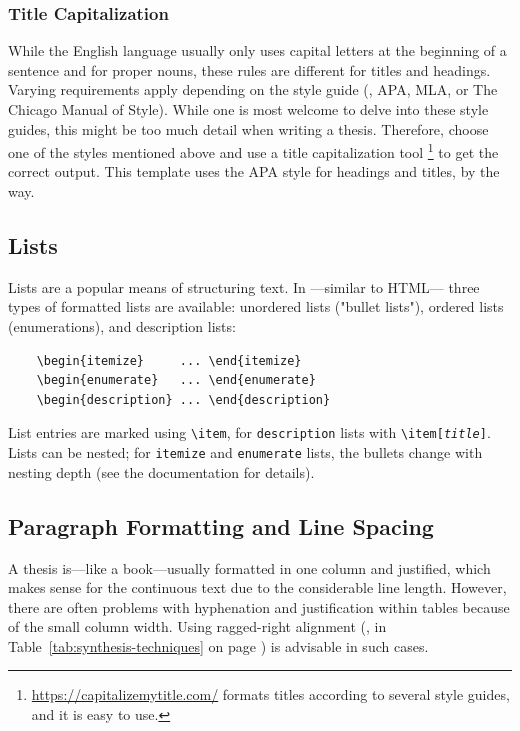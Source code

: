 \subsubsection{Title Capitalization}

While the English language usually only uses capital letters at the beginning of
a sentence and for proper nouns, these rules are different for titles and
headings. Varying requirements apply depending on the style guide (\eg, APA,
MLA, or The Chicago Manual of Style). While one is most welcome to delve into
these style guides, this might be too much detail when writing a thesis.
Therefore, choose one of the styles mentioned above and use a
title capitalization tool%
\footnote{\url{https://capitalizemytitle.com/} formats titles according to
several style guides, and it is easy to use.}
to get the correct output. This template uses the APA style for headings and
titles, by the way.

\subsection{Lists}

Lists are a popular means of structuring text. In \latex---similar to HTML---
three types of formatted lists are available: unordered lists ("bullet lists"),
ordered lists (enumerations), and description lists:
%
\begin{verbatim}
    \begin{itemize}     ... \end{itemize}
    \begin{enumerate}   ... \end{enumerate}
    \begin{description} ... \end{description}
\end{verbatim}
%
List entries are marked using \verb!\item!, for \texttt{description} lists with
\verb!\item[!\texttt{\em title}\verb!]!. Lists can be nested; for
\texttt{itemize} and \texttt{enumerate} lists, the bullets change with nesting
depth (see the \latex documentation for details).

\subsection{Paragraph Formatting and Line Spacing}

A thesis is---like a book---usually formatted in one column and justified, which
makes sense for the continuous text due to the considerable line length.
However, there are often problems with hyphenation and justification within
tables because of the small column width. Using ragged-right alignment (\eg, in
Table~\ref{tab:synthesis-techniques} on page \pageref{tab:synthesis-techniques})
is advisable in such cases.

